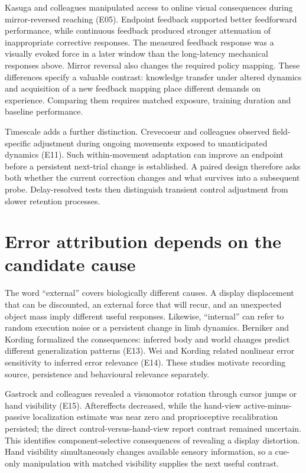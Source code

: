 \documentclass[11pt,a4paper]{article}
\begin{document}
Kasuga and colleagues manipulated access to online visual consequences during mirror-reversed reaching (E05). Endpoint feedback supported better feedforward performance, while continuous feedback produced stronger attenuation of inappropriate corrective responses. The measured feedback response was a visually evoked force in a later window than the long-latency mechanical responses above. Mirror reversal also changes the required policy mapping. These differences specify a valuable contrast: knowledge transfer under altered dynamics and acquisition of a new feedback mapping place different demands on experience. Comparing them requires matched exposure, training duration and baseline performance. \cite{kasuga2015}

Timescale adds a further distinction. Crevecoeur and colleagues observed field-specific adjustment during ongoing movements exposed to unanticipated dynamics (E11). Such within-movement adaptation can improve an endpoint before a persistent next-trial change is established. A paired design therefore asks both whether the current correction changes and what survives into a subsequent probe. Delay-resolved tests then distinguish transient control adjustment from slower retention processes. \cite{crevecoeur2020}

\section{Error attribution depends on the candidate cause}
The word ``external'' covers biologically different causes. A display displacement that can be discounted, an external force that will recur, and an unexpected object mass imply different useful responses. Likewise, ``internal'' can refer to random execution noise or a persistent change in limb dynamics. Berniker and Kording formalized the consequences: inferred body and world changes predict different generalization patterns (E13). Wei and Kording related nonlinear error sensitivity to inferred error relevance (E14). These studies motivate recording source, persistence and behavioural relevance separately. \cite{berniker2008,wei2009}

Gastrock and colleagues revealed a visuomotor rotation through cursor jumps or hand visibility (E15). Aftereffects decreased, while the hand-view active-minus-passive localization estimate was near zero and proprioceptive recalibration persisted; the direct control-versus-hand-view report contrast remained uncertain. This identifies component-selective consequences of revealing a display distortion. Hand visibility simultaneously changes available sensory information, so a cue-only manipulation with matched visibility supplies the next useful contrast. \cite{external2020}
\end{document}
